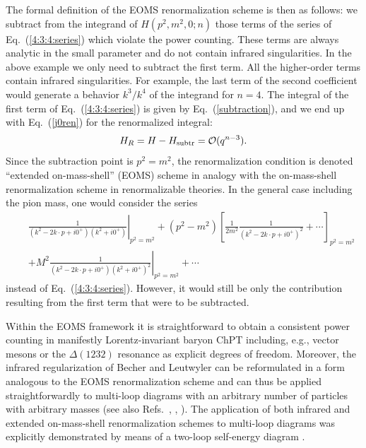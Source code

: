 \documentclass[twoside,12pt]{article}
\begin{document}
   The formal definition of the EOMS renormalization scheme is then as follows:
we subtract from the integrand of $H(p^2,m^2,0;n)$ those terms of the
series of Eq.\ (\ref{4:3:4:series}) which violate the power counting.
    These terms are always analytic in the small parameter and do not
contain infrared singularities.
   In the above example we only need to subtract the first term.
   All the higher-order terms contain infrared singularities.
   For example, the last term of the second coefficient would generate a
behavior $k^3/k^4$ of the integrand for $n=4$.
   The integral of the first term of Eq.\ (\ref{4:3:4:series}) is given
by Eq.\ (\ref{subtraction}), and we end up with Eq.\ (\ref{j0ren}) for
the renormalized integral:
\begin{displaymath}
H_R=H-H_{\rm subtr}={\cal O}(q^{n-3}).
\end{displaymath}
   Since the subtraction point is $p^2=m^2$, the renormalization condition
is denoted ``extended on-mass-shell'' (EOMS) scheme
in analogy with the on-mass-shell renormalization scheme in renormalizable
theories.
   In the general case including the pion mass, one would consider the series
\begin{eqnarray*}
&& \left.\frac{1}{\left( k^2-2 k\cdot p+i 0^+ \right)\left( k^2+i
0^+\right)}\right|_{p^2=m^2}+(p^2-m^2)\left[ \frac{1}{2 m^2} \frac{1}{\left( k^2-2 k\cdot p+i
0^+
\right)^2}+\cdots \right]_{p^2=m^2}\\
&&+M^2 \left. \frac{1}{\left( k^2-2 k\cdot p+i 0^+
\right)\left( k^2+i 0^+\right)^2 }\right|_{p^2=m^2}+\cdots
\end{eqnarray*}
instead of Eq.~(\ref{4:3:4:series}).
   However, it would still be only the contribution resulting from the first
term that were to be subtracted.


   Within the EOMS framework it is straightforward to obtain
a consistent power counting in manifestly Lorentz-invariant
baryon ChPT including, e.g., vector mesons \cite{Fuchs:2003sh} or
the $\Delta(1232)$ resonance \cite{Hacker:2005fh} as explicit
degrees of freedom.
   Moreover, the infrared regularization of Becher and Leutwyler
can be reformulated in a form analogous to the EOMS renormalization
scheme and can thus be applied straightforwardly to multi-loop diagrams
with an arbitrary number of particles with arbitrary masses
\cite{Schindler:2003xv} (see also Refs.\ \cite{Lehmann:2001xm}, \cite{Bruns:2004tj},
\cite{Bruns:2008ub}).
    The application of both infrared and extended on-mass-shell renormalization
schemes to multi-loop diagrams was explicitly demonstrated by means of a
two-loop self-energy diagram \cite{Schindler:2003je}.
\end{document}
